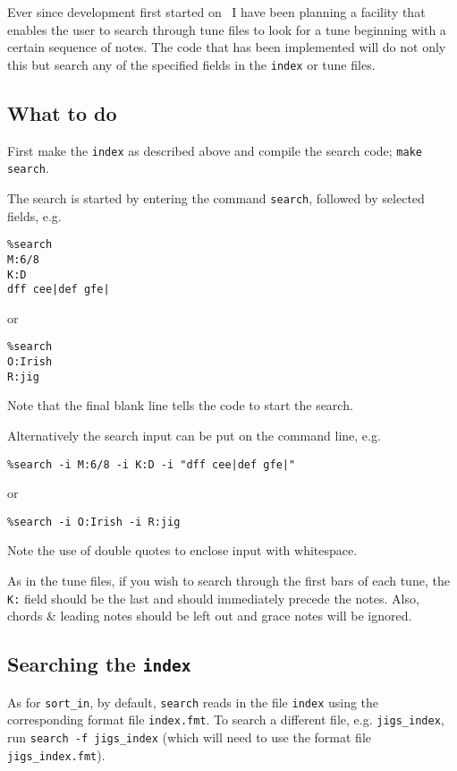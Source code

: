 Ever since development first started on \abctmtex\ I have been
planning a facility that enables the user to search through tune
files to look for a tune beginning with a certain sequence of notes.
The code that has been implemented will do not only this but
search any of the specified fields in the {\tt index} or tune files.

\subsection{What to do}

First make the {\tt index} as described above and compile the search code;
{\tt make search}.

The search is started by entering the command {\tt search}, followed
by selected fields, e.g.
\begin{verbatim}
%search
M:6/8
K:D
dff cee|def gfe|

\end{verbatim}
or
\begin{verbatim}
%search
O:Irish
R:jig

\end{verbatim}
Note that the final blank line tells the code to start the search.

Alternatively the search input can be put on the command line, e.g.
\begin{verbatim}
%search -i M:6/8 -i K:D -i "dff cee|def gfe|"
\end{verbatim}
or
\begin{verbatim}
%search -i O:Irish -i R:jig
\end{verbatim}
Note the use of double quotes to enclose input with whitespace.

As in the tune files, if you wish to search through the first bars of each
tune, the {\tt K:} field should be the last and
should immediately precede the notes. Also, chords \& leading
notes should be left out and grace notes will be ignored.

\subsection{Searching the {\tt index}}

As for {\tt sort\_in}, by default, {\tt search} reads in the file {\tt index}
using the corresponding format file {\tt index.fmt}. To search a different
file, e.g.  {\tt jigs\_index}, run {\tt search -f jigs\_index} (which will
need to use the format file {\tt jigs\_index.fmt}).

